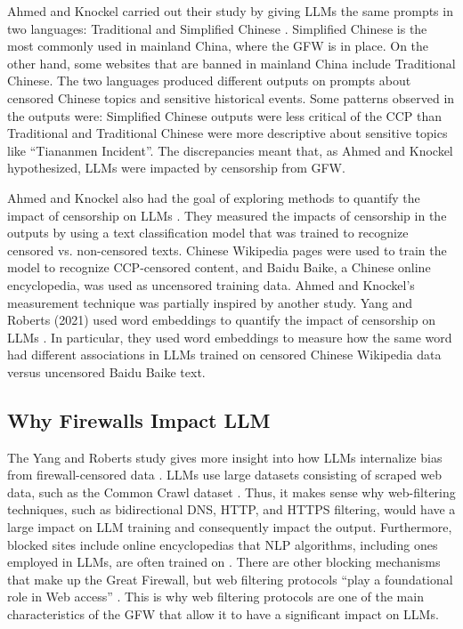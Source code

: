 \documentclass[conference=acm]{confpaper}
\begin{document}
Ahmed and Knockel carried out their study by giving LLMs the same prompts in two languages: Traditional and Simplified Chinese \cite{Ahmed}. Simplified Chinese is the most commonly used in mainland China, where the GFW is in place. On the other hand, some websites that are banned in mainland China include Traditional Chinese. The two languages produced different outputs on prompts about censored Chinese topics and sensitive historical events. Some patterns observed in the outputs were: Simplified Chinese outputs were less critical of the CCP than Traditional and Traditional Chinese were more descriptive about sensitive topics like “Tiananmen Incident”. The discrepancies meant that, as Ahmed and Knockel hypothesized, LLMs were impacted by censorship from GFW. 

Ahmed and Knockel also had the goal of exploring methods to quantify the impact of censorship on LLMs  \cite{Ahmed}. They measured the impacts of censorship in the outputs by using a text classification model that was trained to recognize censored vs. non-censored texts. Chinese Wikipedia pages were used to train the model to recognize CCP-censored content, and Baidu Baike, a Chinese online encyclopedia, was used as uncensored training data. Ahmed and Knockel's measurement technique was partially inspired by another study. Yang and Roberts (2021) used word embeddings to quantify the impact of censorship on LLMs \cite{Yang}. In particular, they used word embeddings to measure how the same word had different associations in LLMs trained on censored Chinese Wikipedia data versus uncensored Baidu Baike text.

\subsection{Why Firewalls Impact LLM}
The Yang and Roberts study gives more insight into how LLMs internalize bias from firewall-censored data \cite{Yang}. LLMs use large datasets consisting of scraped web data, such as the Common Crawl dataset \cite{Brown}. Thus, it makes sense why web-filtering techniques, such as bidirectional DNS, HTTP, and HTTPS filtering, would have a large impact on LLM training and consequently impact the output. Furthermore, blocked sites include online encyclopedias that NLP algorithms, including ones employed in LLMs, are often trained on \cite{Yang}. There are other blocking mechanisms that make up the Great Firewall, but web filtering protocols “play a foundational role in Web access” \cite{Hoang}. This is why web filtering protocols are one of the main characteristics of the GFW that allow it to have a significant impact on LLMs. 
\end{document}
